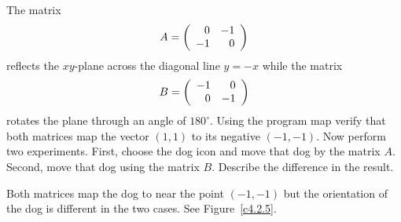 \documentclass{ximera}
\begin{document}
\begin{exercise}  \label{c4.2.5}
The matrix 
\[
A = \left(\begin{array}{rr} 0 & -1\\ -1 &0\end{array}\right)
\]
reflects the $xy$-plane across the diagonal line $y=-x$ while the matrix
\[
B=\left(\begin{array}{rr} -1 & 0\\ 0 &-1\end{array}\right)
\]
rotates the plane through an angle of $180^\circ$. Using the program 
{\sf map} verify that both matrices map the vector $(1,1)$ to its negative
$(-1,-1)$.  Now perform two experiments.  First, choose the {\sf dog} icon 
and move that dog by the matrix $A$.  Second, move that dog using the 
matrix $B$.  Describe the difference in the result.

\begin{solution}
Both matrices map the dog to near the point $(-1,-1)$ but the
orientation of the dog is different in the two cases.  See 
Figure~\ref{c4.2.5}.
\begin{figure}[htb]
     \centerline{%
     \hspace*{-0.6in}
     }
\end{figure} 
\end{solution}
\end{exercise}   
\end{document}
